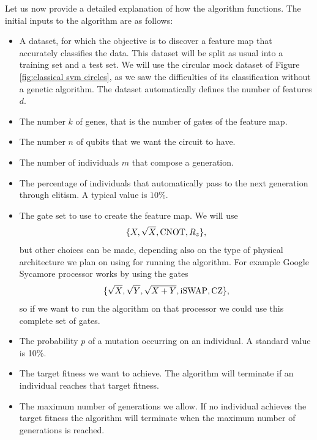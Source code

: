 \documentclass[12pt]{article}
\begin{document}
Let us now provide a detailed explanation of how the algorithm functions. The initial inputs to the algorithm are as follows:
\begin{itemize} 
    \item A dataset, for which the objective is to discover a feature map that accurately classifies the data. This dataset will be split as usual into a training set and a test set. We will use the circular mock dataset of Figure \ref{fig:classical svm circles}, as we saw the difficulties of its classification without a genetic algorithm. The dataset automatically defines the number of features $d$.  
    \item The number $k$ of genes, that is the number of gates of the feature map. 
    \item The number $n$ of qubits that we want the circuit to have.
    \item The number of individuals $m$ that compose a generation.
    \item The percentage of individuals that automatically pass to the next generation through elitism. A typical value is $10\%$.
    \item The gate set to use to create the feature map. We will use $$\{X, \sqrt{X}, \textup{CNOT}, R_z\},$$ but other choices can be made, depending also on the type of physical architecture we plan on using for running the algorithm. For example Google Sycamore processor works by using the gates $$\{\sqrt{X}, \sqrt{Y},\sqrt{X+Y}, \textup{iSWAP}, \text{CZ}\},$$ so if we want to run the algorithm on that processor we could use this complete set of gates. 
    \item The probability $p$ of a mutation occurring on an individual. A standard value is 10\%.
    \item The target fitness we want to achieve. The algorithm will terminate if an individual reaches that target fitness. 
    \item The maximum number of generations we allow. If no individual achieves the target fitness the algorithm will terminate when the maximum number of generations is reached. 
\end{itemize}
\end{document}

